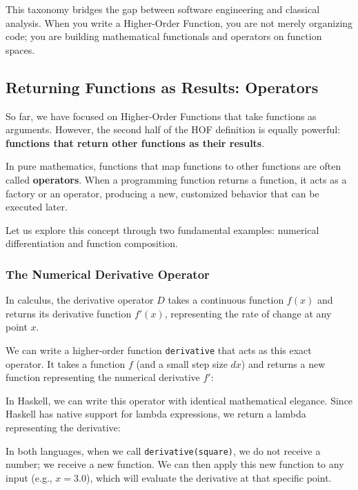 This taxonomy bridges the gap between software engineering and classical analysis. When you write a Higher-Order Function, you are not merely organizing code; you are building mathematical functionals and operators on function spaces.

\subsection{Returning Functions as Results: Operators}

So far, we have focused on Higher-Order Functions that take functions as arguments. However, the second half of the HOF definition is equally powerful: \textbf{functions that return other functions as their results}. 

In pure mathematics, functions that map functions to other functions are often called \textbf{operators}. When a programming function returns a function, it acts as a factory or an operator, producing a new, customized behavior that can be executed later.

Let us explore this concept through two fundamental examples: numerical differentiation and function composition.

\subsubsection{The Numerical Derivative Operator}

In calculus, the derivative operator $D$ takes a continuous function $f(x)$ and returns its derivative function $f'(x)$, representing the rate of change at any point $x$. 

We can write a higher-order function \texttt{derivative} that acts as this exact operator. It takes a function $f$ (and a small step size $dx$) and returns a new function representing the numerical derivative $f'$:



In Haskell, we can write this operator with identical mathematical elegance. Since Haskell has native support for lambda expressions, we return a lambda representing the derivative:



In both languages, when we call \texttt{derivative(square)}, we do not receive a number; we receive a new function. We can then apply this new function to any input (e.g., $x = 3.0$), which will evaluate the derivative at that specific point.

